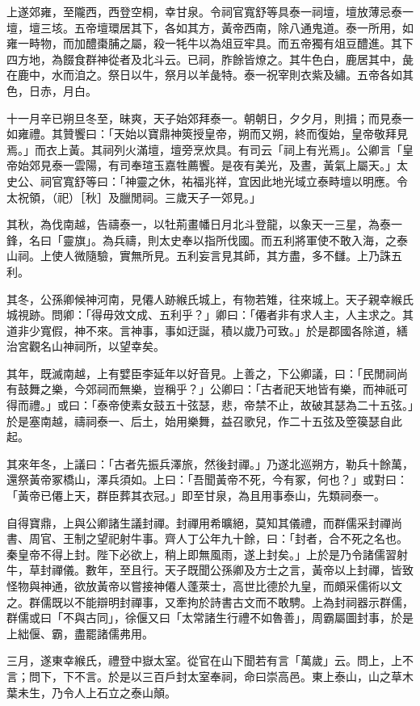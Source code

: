 \begin{pinyinscope}
上遂郊雍，至隴西，西登空桐，幸甘泉。令祠官寬舒等具泰一祠壇，壇放薄忌泰一壇，壇三垓。五帝壇環居其下，各如其方，黃帝西南，除八通鬼道。泰一所用，如雍一畤物，而加醴棗脯之屬，殺一牦牛以為俎豆牢具。而五帝獨有俎豆醴進。其下四方地，為餟食群神從者及北斗云。已祠，胙餘皆燎之。其牛色白，鹿居其中，彘在鹿中，水而洎之。祭日以牛，祭月以羊彘特。泰一祝宰則衣紫及繡。五帝各如其色，日赤，月白。

十一月辛已朔旦冬至，昧爽，天子始郊拜泰一。朝朝日，夕夕月，則揖；而見泰一如雍禮。其贊饗曰：「天始以寶鼎神筴授皇帝，朔而又朔，終而復始，皇帝敬拜見焉。」而衣上黃。其祠列火滿壇，壇旁烹炊具。有司云「祠上有光焉」。公卿言「皇帝始郊見泰一雲陽，有司奉瑄玉嘉牲薦饗。是夜有美光，及晝，黃氣上屬天。」太史公、祠官寬舒等曰：「神靈之休，祐福兆祥，宜因此地光域立泰畤壇以明應。令太祝領，（祀）［秋］及臘閒祠。三歲天子一郊見。」

其秋，為伐南越，告禱泰一，以牡荊畫幡日月北斗登龍，以象天一三星，為泰一鋒，名曰「靈旗」。為兵禱，則太史奉以指所伐國。而五利將軍使不敢入海，之泰山祠。上使人微隨驗，實無所見。五利妄言見其師，其方盡，多不讎。上乃誅五利。

其冬，公孫卿候神河南，見僊人跡緱氏城上，有物若雉，往來城上。天子親幸緱氏城視跡。問卿：「得毋效文成、五利乎？」卿曰：「僊者非有求人主，人主求之。其道非少寬假，神不來。言神事，事如迂誕，積以歲乃可致。」於是郡國各除道，繕治宮觀名山神祠所，以望幸矣。

其年，既滅南越，上有嬖臣李延年以好音見。上善之，下公卿議，曰：「民閒祠尚有鼓舞之樂，今郊祠而無樂，豈稱乎？」公卿曰：「古者祀天地皆有樂，而神祇可得而禮。」或曰：「泰帝使素女鼓五十弦瑟，悲，帝禁不止，故破其瑟為二十五弦。」於是塞南越，禱祠泰一、后土，始用樂舞，益召歌兒，作二十五弦及箜篌瑟自此起。

其來年冬，上議曰：「古者先振兵澤旅，然後封禪。」乃遂北巡朔方，勒兵十餘萬，還祭黃帝冢橋山，澤兵須如。上曰：「吾聞黃帝不死，今有冢，何也？」或對曰：「黃帝已僊上天，群臣葬其衣冠。」即至甘泉，為且用事泰山，先類祠泰一。

自得寶鼎，上與公卿諸生議封禪。封禪用希曠絕，莫知其儀禮，而群儒采封禪尚書、周官、王制之望祀射牛事。齊人丁公年九十餘，曰：「封者，合不死之名也。秦皇帝不得上封。陛下必欲上，稍上即無風雨，遂上封矣。」上於是乃令諸儒習射牛，草封禪儀。數年，至且行。天子既聞公孫卿及方士之言，黃帝以上封禪，皆致怪物與神通，欲放黃帝以嘗接神僊人蓬萊士，高世比德於九皇，而頗采儒術以文之。群儒既以不能辯明封禪事，又牽拘於詩書古文而不敢騁。上為封祠器示群儒，群儒或曰「不與古同」，徐偃又曰「太常諸生行禮不如魯善」，周霸屬圖封事，於是上絀偃、霸，盡罷諸儒弗用。

三月，遂東幸緱氏，禮登中嶽太室。從官在山下聞若有言「萬歲」云。問上，上不言；問下，下不言。於是以三百戶封太室奉祠，命曰崇高邑。東上泰山，山之草木葉未生，乃令人上石立之泰山顛。


\end{pinyinscope}
